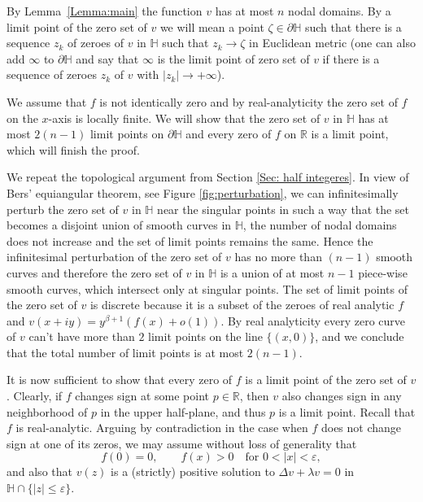 \documentclass{article}
\begin{document}
By Lemma~\ref{Lemma:main} the function $v$ has at most $n$ nodal domains.
By a limit point of the zero set of $v$ we will mean a point $\zeta \in \partial \mathbb{H}$ such that there is a sequence $z_k$ of zeroes of $v$ in $\mathbb{H}$ such that
$z_k \to \zeta$ in Euclidean metric (one can also add $\infty$ to $\partial \mathbb{H}$ and say that $\infty$ is the limit point of zero set of $v$ if there is a sequence of zeroes $z_k$  of $v$ with $|z_k|\to +\infty$).
 

  We assume that $f$ is not identically zero and by real-analyticity the zero set of $f$ on the $x$-axis is locally finite.
We will show that the zero set of $v$ in $\mathbb{H}$ has at most $2(n-1)$ limit points on $\partial \mathbb{H}$ and every zero of $f$ on $\mathbb{R}$ is a limit point, which will finish the proof.

We repeat the topological argument from Section \ref{Sec: half integeres}. In view of Bers' equiangular theorem, see Figure \ref{fig:perturbation},
we can infinitesimally perturb the zero set of $v$ in $\mathbb{H}$ near the singular points in such a way that the set becomes a disjoint union of smooth curves in $\mathbb{H}$, the number of nodal domains does not increase and the set of limit points remains the same. Hence the infinitesimal perturbation of the zero set of $v$ has no more than $(n-1)$ smooth curves and therefore the zero set of $v$ in $\mathbb{H}$ is a union of at most $n-1$ piece-wise smooth curves, which intersect only at singular points. 
 The set of limit points of the zero set of $v$ is discrete because it is a subset of the zeroes of real analytic $f$ and $ v(x+iy)= y^{\beta+1}(f(x)+o(1))$. By real analyticity every zero curve of $v$ can't have more than $2$ limit points on the line $\{(x,0)\} $, and we conclude that the total number of limit points is at most $2(n-1)$.



It is now sufficient to show that every zero of $f$ is a limit point of the zero set of $v$. Clearly, if $f$ changes sign at some point $p \in \mathbb{R}$, then $v$ also changes sign in any neighborhood of $p$ in the upper half-plane, and thus $p$ is a limit point. Recall that $f$ is real-analytic. Arguing by contradiction in the case when $f$ does not change sign at one of its zeros, we may assume without loss of generality that
\[
f(0) = 0,\qquad f(x) > 0 \quad \text{for } 0<|x|<\varepsilon,
\]
and also that $v(z)$ is a (strictly) positive solution to $\Delta v + \lambda v = 0$ in 
\(
\mathbb{H} \cap \{ |z|\le \varepsilon \}.
\)
\end{document}
